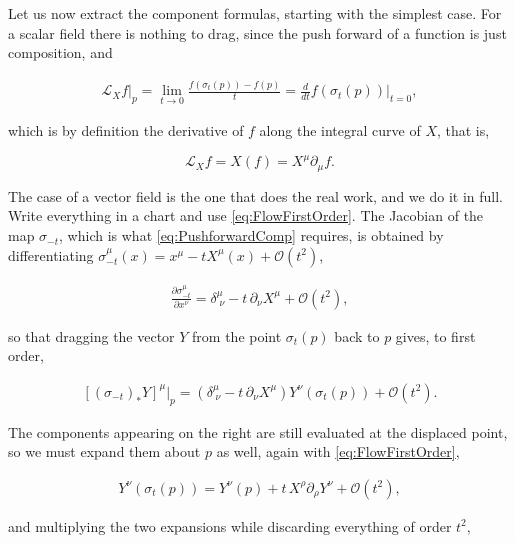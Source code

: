         Let us now extract the component formulas, starting with the simplest case. For a scalar field there is nothing to drag, since the push forward of a function is just composition, and

        \begin{align*}
            \mathcal{L}_Xf\big|_p = \lim_{t\rightarrow 0}\frac{f\left(\sigma_t(p)\right) - f(p)}{t} = \frac{d}{dt}f\left(\sigma_t(p)\right)\Bigg|_{t=0},
        \end{align*}

        which is by definition the derivative of $f$ along the integral curve of $X$, that is,

        \begin{equation}\label{eq:LieScalar}
            \mathcal{L}_Xf = X(f) = X^{\mu}\partial_{\mu}f.
        \end{equation}

        The case of a vector field is the one that does the real work, and we do it in full. Write everything in a chart and use \ref{eq:FlowFirstOrder}. The Jacobian of the map $\sigma_{-t}$, which is what \ref{eq:PushforwardComp} requires, is obtained by differentiating $\sigma^{\mu}_{-t}(x) = x^{\mu} - tX^{\mu}(x) + \mathcal{O}(t^2)$,

        \begin{align*}
            \frac{\partial\sigma^{\mu}_{-t}}{\partial x^{\nu}} = \delta^{\mu}_{\;\nu} - t\,\partial_{\nu}X^{\mu} + \mathcal{O}(t^2),
        \end{align*}

        so that dragging the vector $Y$ from the point $\sigma_t(p)$ back to $p$ gives, to first order,

        \begin{align*}
            \left[\left(\sigma_{-t}\right)_{*}Y\right]^{\mu}\Big|_p = \left(\delta^{\mu}_{\;\nu} - t\,\partial_{\nu}X^{\mu}\right)Y^{\nu}\left(\sigma_t(p)\right) + \mathcal{O}(t^2).
        \end{align*}

        The components appearing on the right are still evaluated at the displaced point, so we must expand them about $p$ as well, again with \ref{eq:FlowFirstOrder},

        \begin{align*}
            Y^{\nu}\left(\sigma_t(p)\right) = Y^{\nu}(p) + t\,X^{\rho}\partial_{\rho}Y^{\nu} + \mathcal{O}(t^2),
        \end{align*}

        and multiplying the two expansions while discarding everything of order $t^2$,

